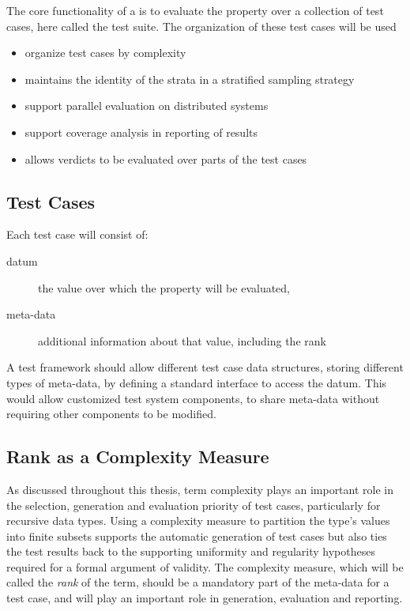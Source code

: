 The core functionality of a \PBT is to evaluate the property over 
a collection of test cases, here called the test suite.
The organization of these test cases will be used 
\begin{itemize}
    \item organize test cases by complexity 
    \item maintains the identity of the strata in a stratified sampling strategy
    \item support parallel evaluation on distributed systems
    \item support coverage analysis in reporting of results
    \item allows verdicts to be evaluated over parts of the test cases
\end{itemize}

\subsection{Test Cases}

Each test case will consist of:

\begin{description}
    \item[datum] the value over which the property will be evaluated,
    \item[meta-data] additional information about that value, including the rank
\end{description} 
\noindent
A test framework should allow different test case data structures,
storing different types of meta-data,
by defining a standard interface to access the datum.
This would allow customized test system components,
to share meta-data without requiring other components to be modified.

\subsection{Rank as a Complexity Measure }\label{sub:reqrank}

As discussed throughout this thesis,
term complexity plays an important role
in the selection, generation and evaluation priority of test cases,
particularly for recursive data types.
Using a complexity measure to partition the type's values into finite subsets
supports the automatic generation of test cases
but also ties the test results back to the supporting uniformity and regularity hypotheses
required for a formal argument of validity.
The complexity measure, which will be called the \emph{rank} of the term,
should be a mandatory part of the meta-data for a test case,
and will play an important role in generation, evaluation and reporting.


